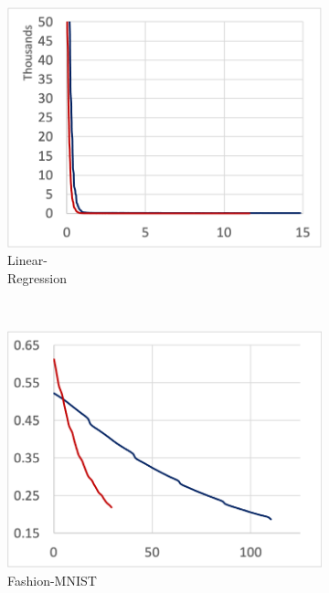 \begin{figure}[!ht]
  \begin{subfigure}[t]{.22\textwidth}
    \includegraphics[width=\textwidth]{tf2-04}
    \caption{\footnotesize Linear-\\Regression}
  \end{subfigure} 
  ~ 
  \begin{subfigure}[t]{.22\textwidth}
    \includegraphics[width=\textwidth]{tf2-05}
    \caption{\footnotesize Fashion-MNIST}
  \end{subfigure}
  ~
  \begin{subfigure}[t]{.22\textwidth}

\end{subfigure}
\end{figure}

